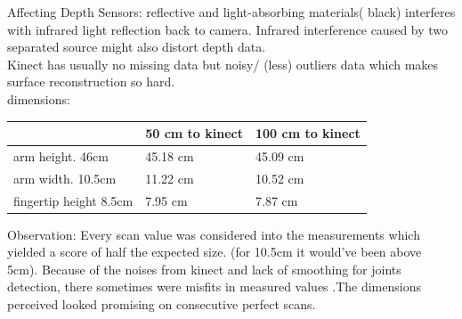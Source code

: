 Affecting Depth Sensors:
reflective and light-absorbing materials( black) interferes with infrared light reflection back to camera. Infrared interference caused by two separated source might also distort depth data.\\
Kinect has usually no missing data but noisy/ (less) outliers data which makes surface reconstruction so hard.\\
dimensions:

\begin{center}
    \begin{tabular}{ | l | l | p{5cm} |}
    \hline
     & 50 cm to kinect & 100 cm to kinect \\ \hline
    arm height. 46cm & 45.18 cm & 45.09 cm \\ \hline
    arm width. 10.5cm & 11.22 cm & 10.52 cm \\ \hline
    fingertip height 8.5cm & 7.95 cm & 7.87 cm \\
    \hline
    \end{tabular}
\end{center}

Observation: Every scan value was considered into the measurements which yielded a score of half the expected size. (for 10.5cm it would’ve been above 5cm). Because of the noises from kinect and lack of smoothing for joints detection, there sometimes were misfits in measured values .The dimensions perceived looked promising on consecutive perfect scans.

